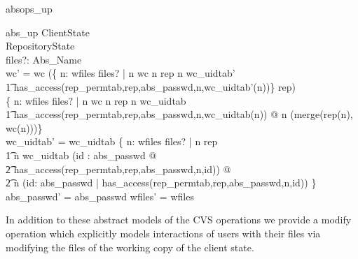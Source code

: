 \begin{doc}{absops_up}
  \begin{schema}{abs\_up}
    \Delta ClientState \\
    \Xi RepositoryState  \\
    files?: \power Abs\_Name \\
    \where 
wc' = wc \oplus (\{ n: wfiles \cap files? | n \notin \dom wc \land n \in \dom rep \land n \in \dom
    wc\_uidtab' \\
    \t1 \land has\_access(rep\_permtab,rep,abs\_passwd,n,wc\_uidtab'(n))\} \dres rep) \\    
    \oplus \{ n: wfiles \cap files? | n \in \dom wc \land n \in \dom rep \land n \in \dom
    wc\_uidtab \\
    \t1 \land has\_access(rep\_permtab,rep,abs\_passwd,n,wc\_uidtab(n)) @ n \mapsto (merge(rep(n), wc(n)))\}\\

    wc\_uidtab' = wc\_uidtab \oplus \{ n: wfiles \cap files? |  n \in \dom rep \\
    \t1 \land n \notin \dom wc\_uidtab \land (\exists id : \dom abs\_passwd @ \\
    \t2 has\_access(rep\_permtab,rep,abs\_passwd,n,id)) @\\
    \t2 n \mapsto (\mu id: \dom abs\_passwd | has\_access(rep\_permtab,rep,abs\_passwd,n,id)) \} \\

    abs\_passwd' = abs\_passwd \land wfiles' = wfiles \\
  \end{schema}
\end{doc}

In addition to these abstract models of the CVS operations we provide a modify operation which explicitly models interactions of users with their files via modifying the files of the working copy of the client state.

